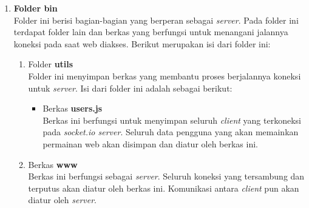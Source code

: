 \begin{enumerate}
	\item \textbf{Folder bin} \\
	Folder ini berisi bagian-bagian yang berperan sebagai \textit{server}. Pada folder ini terdapat folder lain dan berkas yang berfungsi untuk menangani jalannya koneksi pada saat web diakses. Berikut merupakan isi dari folder ini:
	\begin{enumerate}
		\item Folder \textbf{utils} \\
		Folder ini menyimpan berkas yang membantu proses berjalannya koneksi untuk \textit{server}. Isi dari folder ini adalah sebagai berikut:
		\begin{itemize}
			\item Berkas \textbf{users.js}  \\
			Berkas ini berfungsi untuk menyimpan seluruh \textit{client} yang terkoneksi pada \textit{socket.io server}. Seluruh data pengguna yang akan memainkan permainan web akan disimpan dan diatur oleh berkas ini.
		\end{itemize}
	
		\item Berkas \textbf{www} \\
		Berkas ini berfungsi sebagai \textit{server}. Seluruh koneksi yang tersambung dan terputus akan diatur oleh berkas ini. Komunikasi antara \textit{client} pun akan diatur oleh \textit{server}.
	\end{enumerate}
	

\end{enumerate}
